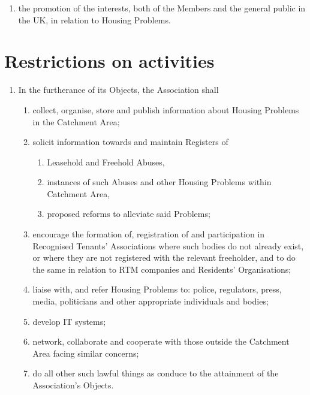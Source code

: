 \documentclass[10pt]{mk-articles-of-association}
\newcommand{\mysection}[1]{
  \end{enumerate}
  \section*{#1}
  \begin{enumerate}[resume]
}
\newcommand{\RTA}[0]{Recognised Tenants' Association}
\newcommand{\LAFA}[0]{Leasehold and Freehold Abuses}
\begin{document}
\begin{enumerate}
\begin{enumerate}
  \item the promotion of the interests, both of the Members and the
    general public in the UK, in relation to Housing Problems.

  \end{enumerate}

\mysection{Restrictions on activities}

\item In the furtherance of its Objects, the Association shall
\begin{enumerate}

  \item collect, organise, store and publish information about
    Housing Problems in the Catchment Area;

  \item solicit information towards and maintain Registers of
    \begin{enumerate}
    \item \LAFA, \ITand
    \item instances of such Abuses and other Housing Problems within
      Catchment Area,
    \item proposed reforms to alleviate said Problems;
    \end{enumerate}

  \item encourage the formation of, registration of and participation
    in \RTA{}s where such bodies do not already exist, or where they
    are not registered with the relevant freeholder, and to do the same
    in relation to RTM companies and Residents' Organisations;

  \item liaise with, and refer Housing Problems to: police, regulators,
    press, media, politicians and other appropriate individuals and bodies;

  \item develop IT systems;

  \item network, collaborate and cooperate with those outside the
    Catchment Area facing similar concerns;

  \item do all other such lawful things as conduce to the attainment
    of the Association's Objects.
\end{enumerate}


\end{enumerate}
\end{document}

